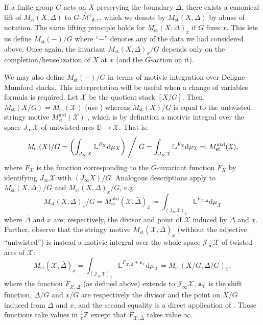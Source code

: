 \documentclass[12pt]{amsart}
\theoremstyle{plain}   %
\theoremstyle{definition}    %
\theoremstyle{remark}    %
\numberwithin{equation}{theorem}
\DeclareMathOperator{\st}{\mathrm{st}}
\DeclareMathOperator{\utd}{\mathrm{utd}}
\newcommand{\kay}{\mathcal{k}}
\newcommand{\sJ}{\mathcal{J}}
\newcommand{\sM}{\mathcal{M}}
\newcommand{\sX}{\mathcal{X}}
\newcommand{\bD}{\mathbb{D}}
\newcommand{\bL}{\mathbb{L}}
\newcommand{\bZ}{\mathbb{Z}}
\begin{document}
If a finite group $G$ acts on $X$  preserving the boundary $\Delta$, there exists a canonical lift of $M_{\st}(X,\Delta)$ to $G\textrm{-}\hat{\sM}'_{\kay,r}$, which we denote by $M_{\st}(X,\Delta)$ by abuse of notation. The same lifting principle holds for $M_{\st}(X,\Delta)_x$ if $G$ fixes $x$. This lets us define $M_{\st}(-)/G$ where ``$-$'' denotes any of the data we had considered above. Once again, the invariant $M_{\st}(X,\Delta)_x/G$ depends only on the completion/henselization of $X$ at $x$ (and the $G$-action on it). 

We may also define $M_{\st}(-)/G$ in terms of motivic integration over Deligne--Mumford stacks. This interpretation will be useful when a change of variables formula is required. Let $\sX$ be the quotient stack $[X/G]$. Then, $M_{\st}(X/G) =M_{\st}(\sX)$ (use \cite[Theorem 1.2]{YasudaMotivicIntegrationDeligneMumfordStack}) whereas $M_{\st}(X)/G$ is equal to the untwisted stringy motive $M_{\st}^{\utd}(\sX)$
\cite[Definition 13.2]{YasudaMotivicIntegrationDeligneMumfordStack}, which is
by definition a motivic integral over the space $J_{\infty}\sX$ of untwisted arcs $\bD \to\sX$. That is:
\[
M_{\st}(X)/G =\left ( \int_{J_{\infty} X} \bL^{F_{X}} \mathrm{d} \mu_{X}\right)\Biggm/G= \int_{J_{\infty} \sX} \bL^{F_{\sX}} \mathrm{d} \mu_{\sX} \eqqcolon M_{\st}^{\utd}(\sX),
\]
where $F_{\sX}$ is the function corresponding to the $G$-invariant function $F_{X}$ by identifying $J_\infty \sX$ with $(J_\infty X)/G$. 
Analogous descriptions apply to $M_{\st}(X,\Delta)/G$ and $M_{\st}(X,\Delta)_x/G$, e.g.
\[
M_{\st}(X,\Delta)_x/G = M_{\st}^{\utd}(\sX, \bar{\Delta})_{\bar{x}} \coloneqq \int_{(J_{\infty}\sX )_{\bar{x}} } \bL^{F_{\sX, \bar{\Delta}}} \mathrm{d} \mu_{\sX}
\]
where $\bar{\Delta}$ and $\bar{x}$ are; respectively, the divisor and point of $\sX$ induced by $\Delta$ and $x$. Further, observe that the stringy motive  $M_{\st}(\sX,\bar{\Delta})_{\bar{x}}$ (without the
adjective ``untwisted'') is instead a motivic integral over the
whole space $\sJ_{\infty}\sX$ of twisted arcs of $\sX$:
\[
M_{\st}(\sX, \bar{\Delta})_{\bar {x}} = \int_{(\sJ_\infty \sX)_{\bar{x}}} \bL^{F_{\sX,\bar{\Delta}}+ \mathfrak{s}_\sX} \mathrm{d}\mu_\sX = M_{\st}(X/G, \Delta/G)_{\bar{x}},
\]
where the function $F_{\sX,\bar{\Delta}}$ (as defined above) extends to $\sJ_\infty \sX$, $\mathfrak{s}_{\sX}$ is the shift function, $\Delta/G$ and $x/G$ are respectively the divisor and the point on $X/G$ induced from $\Delta$ and $x$, and the second equality is a direct application of \cite[Theorem 1.2]{YasudaMotivicIntegrationDeligneMumfordStack}. Those functions take values in $\frac{1}{r}\bZ$ except that $F_{\sX,\bar{\Delta}}$ takes value $\infty$
\end{document}
